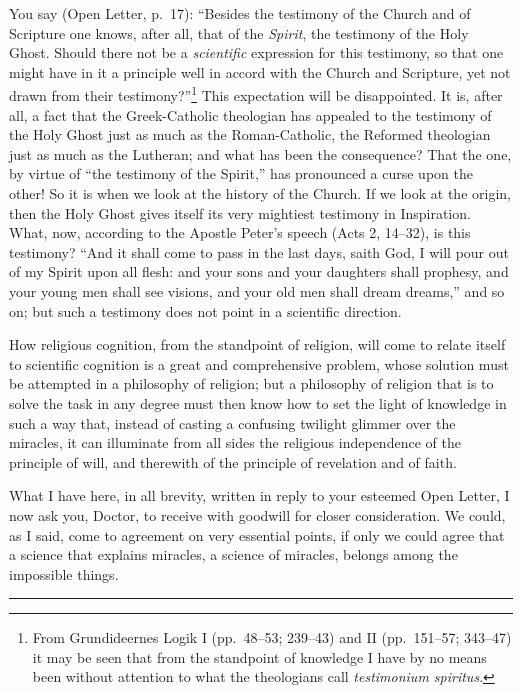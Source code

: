\documentclass[12pt,a4paper]{article}
\newcommand{\opage}[1]{\marginnote{\footnotesize\textit{[#1]}}}
\begin{document}
You say (Open Letter, p.~17): ``Besides the testimony of the Church
and of Scripture one knows, after all, that of the \emph{Spirit},
the testimony of the Holy Ghost. Should there not be a
\emph{scientific} expression for this testimony, so that one might
have in it a principle well in accord with the Church and Scripture,
yet not drawn from their testimony?''\footnote{From Grundideernes
Logik I (pp.~48--53; 239--43) and II (pp.~151--57; 343--47) it may be
seen that from the standpoint of knowledge I have by no means been
without attention to what the theologians call \textit{testimonium
spiritus}.} This expectation will be disappointed. It is, after all,
a fact that the Greek-Catholic theologian has appealed to the
testimony of the Holy Ghost just as much as the Roman-Catholic, the
Reformed theologian just as much as the Lutheran; and what has been
the consequence? That the one, by virtue of ``the testimony of the
Spirit,'' has pronounced a curse upon the other! So it is when we
look at the history of the Church. If we look at the origin, then
the Holy Ghost gives itself its very mightiest testimony in
Inspiration. What, now, according to the Apostle Peter's speech
(Acts 2, 14--32), is this testimony? ``And it shall come to pass in
the last days, saith God, I will pour out of my Spirit upon all
flesh: and your sons and your daughters shall prophesy, and your
young men shall see visions, and your old men shall dream dreams,''
and so on; but such a testimony does not point in a scientific
direction.

How religious cognition, from the standpoint of religion, will come
to relate itself to scientific cognition is a great and comprehensive
problem, whose solution must be attempted in a philosophy of
religion; but a philosophy of religion that is to solve the task in
any degree must then know how to set the light of knowledge in such
a way that, instead of casting a confusing twilight glimmer over the
miracles, it can illuminate from all sides
\opage{16}%
the religious independence of the principle of will, and therewith
of the principle of revelation and of faith.

What I have here, in all brevity, written in reply to your esteemed
Open Letter, I now ask you, Doctor, to receive with goodwill for
closer consideration. We could, as I said, come to agreement on very
essential points, if only we could agree that a science that
explains miracles, a science of miracles, belongs among the
impossible things.

\begin{center}
\rule{0.25\textwidth}{0.4pt}
\end{center}
\end{document}
